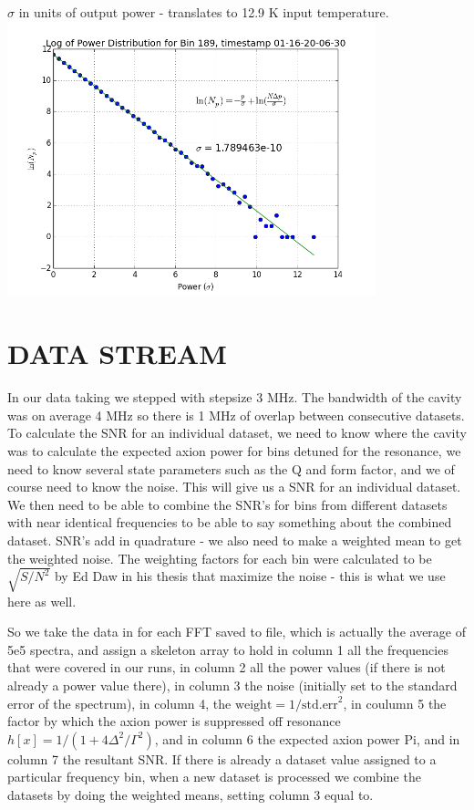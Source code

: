 \documentclass[11pt]{article}
\begin{document}
$\sigma$ in units of output power - translates to 12.9 K input temperature.
\includegraphics[width=0.8\textwidth]{logexpdistribution189}

\section{DATA STREAM}

In our data taking we stepped with stepsize 3 MHz. The bandwidth of the cavity was on average 4 MHz so there is 1 MHz of overlap between consecutive datasets. To calculate the SNR for an individual dataset, we need to know where the cavity was to calculate the expected axion power for bins detuned for the resonance, we need to know several state parameters such as the Q and form factor, and we of course need to know the noise. This will give us a SNR for an individual dataset. We then need to be able to combine the SNR’s for bins from different datasets with near identical frequencies to be able to say something about the combined dataset. SNR’s add in quadrature - we also need to make a weighted mean to get the weighted noise. The weighting factors for each bin were calculated to be $\sqrt{S/N^2}$ by Ed Daw in his thesis that maximize the noise - this is what we use here as well.

So we take the data in for each FFT saved to file, which is actually the average of 5e5 spectra, and assign a skeleton array to hold in column 1 all the frequencies that were covered in our runs, in column 2 all the power values (if there is not already a power value there), in column 3 the noise (initially set to the standard error of the spectrum), in column 4, the $\text{weight}=1/\text{std.err}^2$, in coulumn 5 the factor by which the axion power is suppressed off resonance $h[x] = 1/(1+4\Delta^2/\Gamma^2)$, and in column 6 the expected axion power Pi, and in column 7 the resultant SNR. If there is already a dataset value assigned to a particular frequency bin, when a new dataset is processed we combine the datasets by doing the weighted means, setting column 3 equal to.
\end{document}

